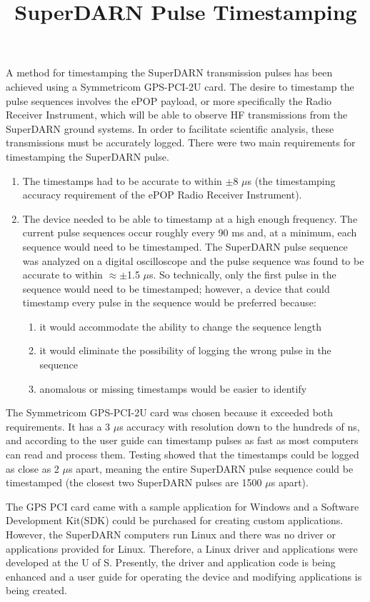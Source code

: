 \documentclass[11pt]{article}
\title{SuperDARN Pulse Timestamping}
\begin{document}
\maketitle

A method for timestamping the SuperDARN transmission pulses has been achieved using a Symmetricom GPS-PCI-2U card.  The desire to timestamp the pulse sequences involves the ePOP payload, or more specifically the Radio Receiver Instrument, which will be able to observe HF transmissions from the SuperDARN ground systems. In order to facilitate scientific analysis, these transmissions must be accurately logged.  There were two main requirements for timestamping the SuperDARN pulse.  
\begin{enumerate}
 \item The timestamps had to be accurate to within $\pm$8 $\mu$s (the timestamping accuracy requirement of the ePOP Radio Receiver Instrument).
 \item The device needed to be able to timestamp at a high enough frequency.  The current pulse sequences occur roughly every 90 ms and, at a minimum, each sequence would need to be timestamped.  The SuperDARN pulse sequence was analyzed on a digital oscilloscope and the pulse sequence was found to be accurate to within $\approx \pm$1.5 $\mu$s.  So technically, only the first pulse in the sequence would need to be timestamped; however, a device that could timestamp every pulse in the sequence would be preferred because:
  \begin{enumerate}
   \item it would accommodate the ability to change the sequence length
   \item it would eliminate the possibility of logging the wrong pulse in the sequence
   \item anomalous or missing timestamps would be easier to identify
  \end{enumerate}
\end{enumerate}

The Symmetricom GPS-PCI-2U card was chosen because it exceeded both requirements.  It has a 3 $\mu$s accuracy with resolution down to the hundreds of ns, and according to the user guide can timestamp pulses as fast as most computers can read and process them.  Testing showed that the timestamps could be logged as close as 2 $\mu$s apart, meaning the entire SuperDARN pulse sequence could be timestamped (the closest two SuperDARN pulses are 1500 $\mu$s apart).

The GPS PCI card came with a sample application for Windows and a Software Development Kit(SDK) could be purchased for creating custom applications.  However, the SuperDARN computers run Linux and there was no driver or applications provided for Linux. Therefore, a Linux driver and applications were developed at the U of S.  Presently, the driver and application code is being enhanced and a user guide for operating the device and modifying applications is being created.
\end{document}
